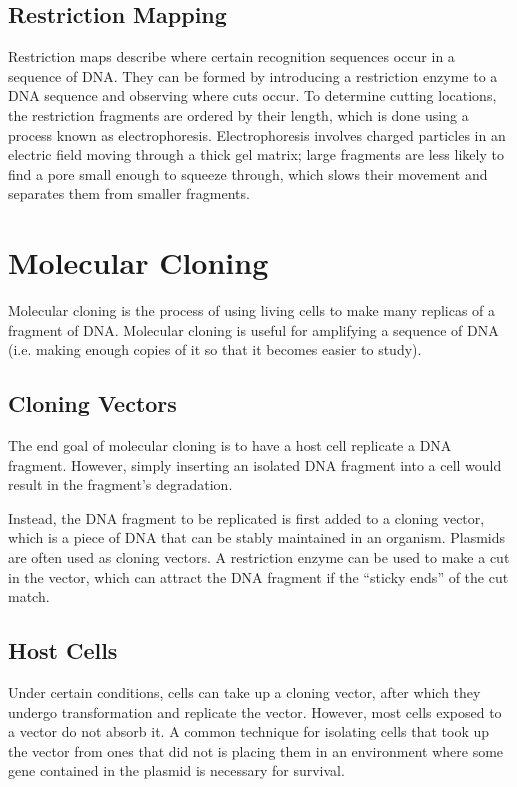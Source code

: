 \documentclass[12pt,titlepage]{article}
\begin{document}
    \subsection{Restriction Mapping}
      Restriction maps describe where certain recognition sequences occur in a sequence of DNA. They can be formed by introducing a restriction enzyme
      to a DNA sequence and observing where cuts occur. To determine cutting locations, the restriction fragments are ordered by their length, which is
      done using a process known as electrophoresis. Electrophoresis involves charged particles in an electric field moving through a thick gel matrix;
      large fragments are less likely to find a pore small enough to squeeze through, which slows their movement and separates them from smaller fragments.

  \newpage

  \section{Molecular Cloning}
    Molecular cloning is the process of using living cells to make many replicas of a fragment of DNA. Molecular cloning is useful for amplifying a
    sequence of DNA (i.e. making enough copies of it so that it becomes easier to study).

    \subsection{Cloning Vectors}
      The end goal of molecular cloning is to have a host cell replicate a DNA fragment. However, simply inserting an isolated DNA fragment into
      a cell would result in the fragment's degradation.

      Instead, the DNA fragment to be replicated is first added to a cloning vector, which is a piece of DNA that can be stably maintained in an
      organism. Plasmids are often used as cloning vectors. A restriction enzyme can be used to make a cut in the vector, which can attract the DNA
      fragment if the ``sticky ends'' of the cut match.

    \subsection{Host Cells}
      Under certain conditions, cells can take up a cloning vector, after which they undergo transformation and replicate the vector. However, most
      cells exposed to a vector do not absorb it. A common technique for isolating cells that took up the vector from ones that did not is placing
      them in an environment where some gene contained in the plasmid is necessary for survival.
\end{document}
